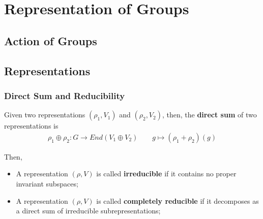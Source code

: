 \documentclass[Total.tex]{subfiles}
\begin{document}
	\chapter{Representation of Groups}
		\section{Action of Groups}
		\section{Representations}
			\subsection{Direct Sum and Reducibility}
				\begin{Def}
					Given two representations $(\rho_1,V_1)$ and $(\rho_2,V_2)$, then, the \textbf{direct sum} of two representations is 
					\begin{gather*}
						\rho_1\oplus \rho_2:G\rightarrow End(V_1\oplus V_2)\qquad g\mapsto  (\rho_1+\rho_2)(g)
					\end{gather*}
				\end{Def}
				
				Then,
				\begin{Def}
					\begin{itemize}
						\item A representation $(\rho,V)$ is called \textbf{irreducible} if it contains no proper invariant subspaces;
						\item A representation $(\rho,V)$ is called \textbf{completely reducible} if it decomposes as a direct sum of irreducible subrepresentations;
					\end{itemize}
				\end{Def}
\end{document}
